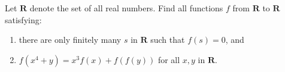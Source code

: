 Let $\mathbf{R}$ denote the set of all real numbers. Find all functions $f$ from $\mathbf{R}$ to $\mathbf{R}$ satisfying:
\begin{enumerate}[label=(\roman*)]
	\item there are only finitely many $s$ in $\mathbf{R}$ such that $f(s)=0$, and
	\item $f(x^4+y)=x^3f(x)+f(f(y))$ for all $x,y$ in $\mathbf{R}$.
\end{enumerate}